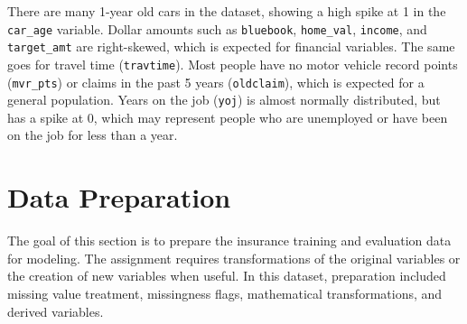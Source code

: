 \documentclass[
  11pt]{article}
\begin{document}
There are many 1-year old cars in the dataset, showing a high spike at 1
in the \texttt{car\_age} variable. Dollar amounts such as
\texttt{bluebook}, \texttt{home\_val}, \texttt{income}, and
\texttt{target\_amt} are right-skewed, which is expected for financial
variables. The same goes for travel time (\texttt{travtime}). Most
people have no motor vehicle record points (\texttt{mvr\_pts}) or claims
in the past 5 years (\texttt{oldclaim}), which is expected for a general
population. Years on the job (\texttt{yoj}) is almost normally
distributed, but has a spike at 0, which may represent people who are
unemployed or have been on the job for less than a year.

\section{Data Preparation}\label{data-preparation}

The goal of this section is to prepare the insurance training and
evaluation data for modeling. The assignment requires transformations of
the original variables or the creation of new variables when useful. In
this dataset, preparation included missing value treatment, missingness
flags, mathematical transformations, and derived variables.
\end{document}
